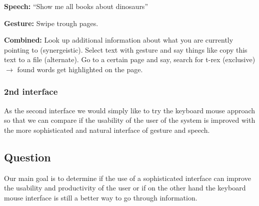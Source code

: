 \documentclass[a4paper, 10pt]{article}
\begin{document}
	\textbf{Speech:}  “Show me all books about dinosaurs”

	\textbf{Gesture:} Swipe trough pages.

	\textbf{Combined:} Look up additional information about what you are currently pointing to (synergeistic). Select text with gesture and say things like copy this text to a file (alternate). Go to a certain page and say, search for t-rex (exclusive) $\rightarrow$ found words get highlighted on the page.
	
	\subsubsection{2nd interface}
	\par{As the second interface we would simply like to try the keyboard mouse approach so that we can compare if the usability of the user of the system is improved with the more sophisticated and natural interface of gesture and speech.}
	
	\subsection{Question}
	
	\par{Our main goal is to determine if the use of a sophisticated interface can improve the usability and productivity of the user or if on the other hand the keyboard mouse interface is still a better way to go through information.}
	
	
	
\end{document}
